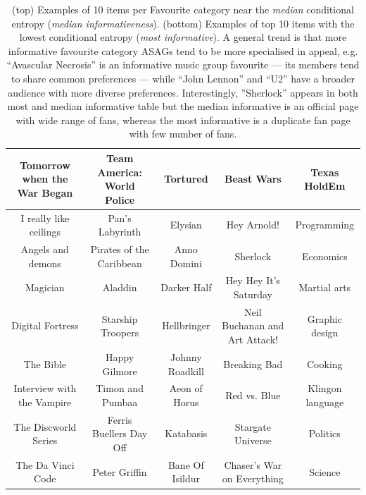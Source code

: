 \begin{table}[t!]
{\begin{tabular}{|c|c|c|c|c|}
\hline
Tomorrow when the War Began & Team America: World Police & Tortured & Beast Wars & Texas HoldEm \\
\hline
I really like ceilings  & Pan's Labyrinth & Elysian & Hey Arnold! & Programming\\
\hline
Angels and demons  & Pirates of the Caribbean & Anno Domini & Sherlock & Economics\\
\hline
Magician  & Aladdin & Darker Half & Hey Hey It's Saturday & Martial arts\\
\hline
Digital Fortress  & Starship Troopers & Hellbringer & Neil Buchanan and Art Attack! & Graphic design\\
\hline
The Bible  & Happy Gilmore & Johnny Roadkill & Breaking Bad & Cooking\\
\hline
Interview with the Vampire  & Timon and Pumbaa & Aeon of Horus & Red vs. Blue & Klingon language\\
\hline
The Discworld Series  & Ferris Buellers Day Off & Katabasis & Stargate Universe & Politics\\
\hline
The Da Vinci Code  & Peter Griffin & Bane Of Isildur & Chaser's War on Everything & Science\\
\hline
\end{tabular}}
\caption{(top) Examples of 10 items per Favourite category near the \emph{median} conditional entropy (\emph{median informativeness}).
(bottom) Examples of top 10 items with the lowest conditional entropy (\emph{most informative}).
A general trend is that more informative favourite category ASAGs tend to be more specialised in
appeal, e.g. ``Avascular Necrosis'' is an informative music group favourite --- its members
tend to share common preferences --- while ``John Lennon'' and ``U2'' have a broader audience with
more diverse preferences. 
Interestingly, ''Sherlock''  appears in both most and median informative table but the median informative is
an official page with wide range of fans, whereas the most informative is a duplicate fan page with few number of fans.}
\label{table:fav_examples}
\end{table}

